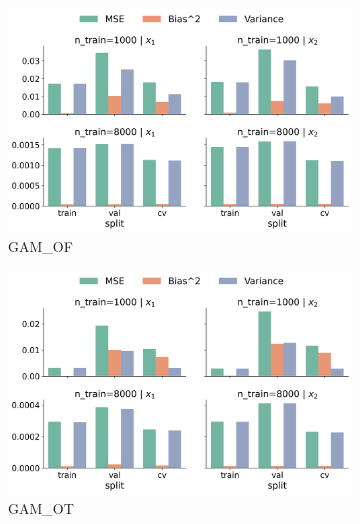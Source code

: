 \documentclass[runningheads]{llncs}
\begin{document}
\begin{figure}[htbp]
    \centering
    \begin{subfigure}[b]{0.49\textwidth}
        \includegraphics[width=\textwidth]{img/SNC/feature_effect_errors_ale_GAM_OF.png}
        \caption{GAM\_OF}
        \label{fig:ale-results-snc-gam-of}  %
    \end{subfigure}
    \hfill
    \begin{subfigure}[b]{0.49\textwidth}
        \includegraphics[width=\textwidth]{img/SNC/feature_effect_errors_ale_GAM_OT.png}
        \caption{GAM\_OT}
        \label{fig:ale-results-snc-gam-ot}  %
    \end{subfigure}
    \\[10pt]
    \vfill
    \begin{subfigure}[b]{0.49\textwidth}

\end{subfigure}
\end{figure}
\end{document}
